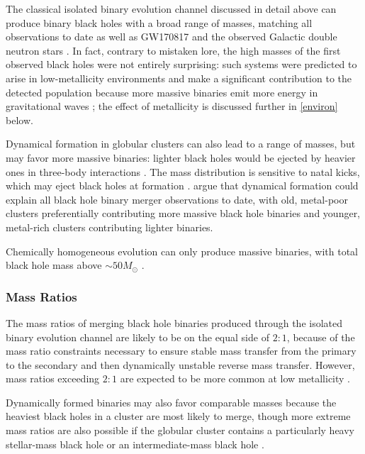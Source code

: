 \documentclass[iop,onecolumn]{revtex4}
\begin{document}
The classical isolated binary evolution channel discussed in detail above can produce binary black holes with a broad range of masses, matching all observations to date \citep[e.g.,][]{Stevenson:2017} as well as GW170817 and the observed Galactic double neutron stars \citep[e.g.,][]{Kruckow:2018,VignaGomez:2018}.  In fact, contrary to mistaken lore, the high masses of the first observed black holes were not entirely surprising: such systems were predicted to arise in low-metallicity environments and make a significant contribution to the detected population because more massive binaries emit more energy in gravitational waves \citep{Dominik:2014}; the effect of metallicity is discussed further in \autoref{environ} below. 

 Dynamical formation in globular clusters can also lead to a range of masses, but may favor more massive binaries: lighter black holes would be ejected by heavier ones in three-body interactions \citep{Rodriguez:2015}. The mass distribution is sensitive to natal kicks, which may eject black holes at formation \citep{Zevin:2017}.  \citet{Chatterjee:2017} argue that dynamical formation could explain all black hole binary merger observations to date, with old, metal-poor clusters preferentially contributing more massive black hole binaries and younger, metal-rich clusters contributing lighter binaries.
 
  Chemically homogeneous evolution can only produce massive binaries, with total black hole mass above $\sim 50 M_\odot$ \citep{MandeldeMink:2016,Marchant:2016}.

\subsubsection{Mass Ratios}
The mass ratios of merging black hole binaries produced through the isolated binary evolution channel are likely to be on the equal side of $2:1$, because of the mass ratio constraints necessary to ensure stable mass transfer from the primary to the secondary and then dynamically unstable reverse mass transfer. However, mass ratios exceeding $2:1$ are expected to be more common at low metallicity \citep{Dominik:2012,Stevenson:2017}.

Dynamically formed binaries may also favor comparable masses because the heaviest black holes in a cluster are most likely to merge, though more extreme mass ratios are also possible if the globular cluster contains a particularly heavy stellar-mass black hole or an intermediate-mass black hole \citep{Mandel:2008,Belczynski:2014VMS}. 
\end{document}
